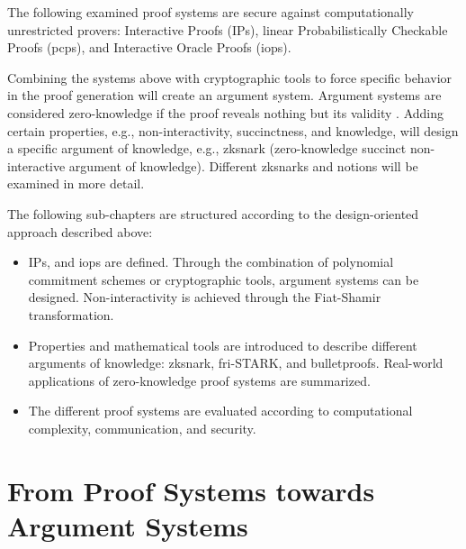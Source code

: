 The following examined proof systems are secure against computationally unrestricted provers: Interactive Proofs (IPs), linear Probabilistically Checkable Proofs (\acrshort{pcp}s), and Interactive Oracle Proofs (\acrshort{iop}s). 

Combining the systems above with cryptographic tools to force specific behavior in the proof generation will create an argument system. Argument systems are considered zero-knowledge if the proof reveals nothing but its validity \citep{GoldwasserIPs}. Adding certain properties, e.g., non-interactivity, succinctness, and knowledge, will design a specific argument of knowledge, e.g., \acrshort{zksnark} (zero-knowledge succinct non-interactive argument of knowledge). Different \acrshort{zksnark}s and notions will be examined in more detail.

The following sub-chapters are structured according to the design-oriented approach described above:
\begin{itemize}
    \item IPs, and \acrshort{iop}s are defined. Through the combination of polynomial commitment schemes or cryptographic tools, argument systems can be designed. Non-interactivity is achieved through the Fiat-Shamir transformation.
    \item Properties and mathematical tools are introduced to describe different arguments of knowledge: \acrshort{zksnark}, \acrshort{fri}-STARK, and bulletproofs. Real-world applications of zero-knowledge proof systems are summarized.
    \item The different proof systems are evaluated according to computational complexity, communication, and security.
\end{itemize}

\section{From Proof Systems towards Argument Systems}

